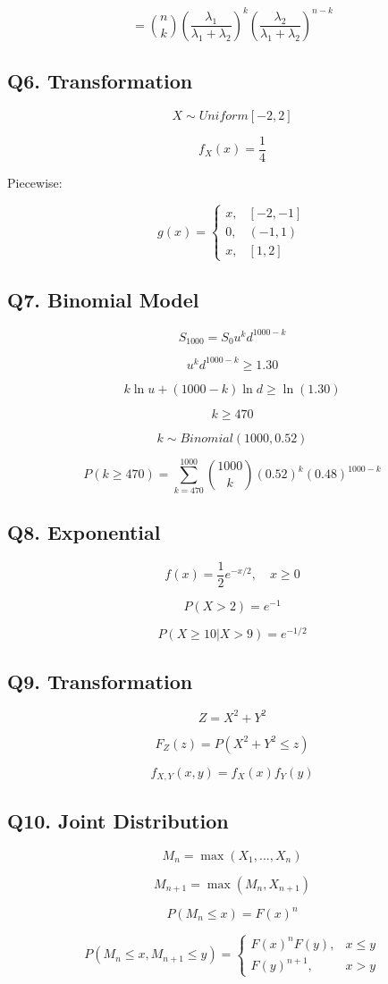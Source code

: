 \documentclass{article}
\begin{document}
\[
= \binom{n}{k} \left(\frac{\lambda_1}{\lambda_1+\lambda_2}\right)^k
\left(\frac{\lambda_2}{\lambda_1+\lambda_2}\right)^{n-k}
\]

\subsection*{Q6. Transformation}

\[
X \sim Uniform[-2,2]
\]

\[
f_X(x) = \frac{1}{4}
\]

Piecewise:

\[
g(x) =
\begin{cases}
x, & [-2,-1] \\
0, & (-1,1) \\
x, & [1,2]
\end{cases}
\]

\subsection*{Q7. Binomial Model}

\[
S_{1000} = S_0 u^k d^{1000-k}
\]

\[
u^k d^{1000-k} \ge 1.30
\]

\[
k \ln u + (1000-k)\ln d \ge \ln(1.30)
\]

\[
k \ge 470
\]

\[
k \sim Binomial(1000, 0.52)
\]

\[
P(k \ge 470) = \sum_{k=470}^{1000} \binom{1000}{k} (0.52)^k (0.48)^{1000-k}
\]

\subsection*{Q8. Exponential}

\[
f(x) = \frac{1}{2} e^{-x/2}, \quad x \ge 0
\]

\[
P(X>2) = e^{-1}
\]

\[
P(X \ge 10 | X>9) = e^{-1/2}
\]

\subsection*{Q9. Transformation}

\[
Z = X^2 + Y^2
\]

\[
F_Z(z) = P(X^2 + Y^2 \le z)
\]

\[
f_{X,Y}(x,y) = f_X(x)f_Y(y)
\]

\subsection*{Q10. Joint Distribution}

\[
M_n = \max(X_1,...,X_n)
\]

\[
M_{n+1} = \max(M_n, X_{n+1})
\]

\[
P(M_n \le x) = F(x)^n
\]

\[
P(M_n \le x, M_{n+1} \le y) =
\begin{cases}
F(x)^n F(y), & x \le y \\
F(y)^{n+1}, & x > y
\end{cases}
\]
\end{document}
